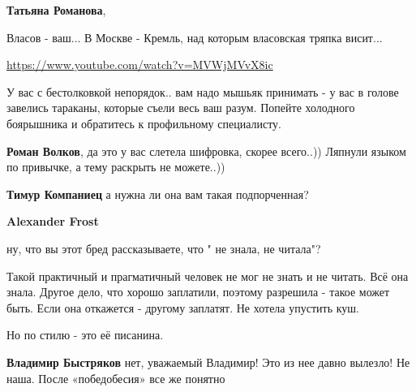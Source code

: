 \begin{itemize}
\begin{itemize}
\textbf{Татьяна Романова}, 

Власов - ваш... В Москве - Кремль, над которым власовская тряпка висит... 

\url{https://www.youtube.com/watch?v=MVWjMVvX8ic}

У вас с бестолковкой непорядок.. вам надо мышьяк принимать - у вас в голове
завелись тараканы, которые съели весь ваш разум. Попейте холодного боярышника и
обратитесь к профильному специалисту.

 
\textbf{Роман Волков}, да это у вас слетела шифровка, скорее всего..)) Ляпнули языком по привычке, а тему раскрыть не можете..))

 
\textbf{Тимур Компаниец} а нужна ли она вам такая подпорченная?

 
\textbf{Alexander Frost}

ну, что вы этот бред рассказываете, что " не знала, не читала"?

Такой практичный и прагматичный человек не мог не знать и не читать. Всё она
знала. Другое дело, что хорошо заплатили, поэтому разрешила - такое может быть.
Если она откажется - другому заплатят. Не хотела упустить куш.

Но по стилю - это её писанина.

 
\textbf{Владимир Быстряков} нет, уважаемый Владимир! Это из нее давно вылезло!
Не наша. После «победобесия» все же понятно

 

\end{itemize}
\end{itemize}
